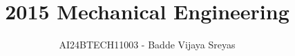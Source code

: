 \documentclass[journal]{IEEEtran}
\begin{document}

\vspace{3cm}

\title{2015 Mechanical Engineering}
\author{AI24BTECH11003 - Badde Vijaya Sreyas}
{\let\newpage\relax\maketitle}

\renewcommand{\thefigure}{\theenumi}
\renewcommand{\thetable}{\theenumi}
\setlength{\intextsep}{10pt} %


\renewcommand{\thetable}{\theenumi}
\end{document}
